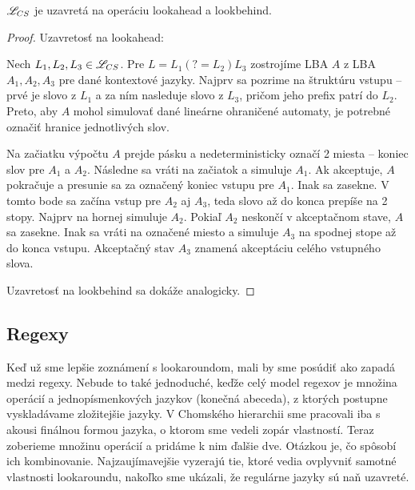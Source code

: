 \begin{veta} \label{CS-lookahead}
$ \mathscr{L}_{CS} $ je uzavretá na operáciu lookahead a lookbehind.
\end{veta} 
\begin{proof}
Uzavretosť na lookahead:

Nech $ L_{1}, L_{2}, L_{3} \in \mathscr{L}_{CS} $. Pre $ L = L_{1}(?=L_{2})L_{3} $ zostrojíme LBA $A$ z LBA $A_1, A_2, A_3$ pre dané kontextové jazyky. Najprv sa pozrime na štruktúru vstupu -- prvé je slovo z $L_1$ a za ním nasleduje slovo z $L_3$, pričom jeho prefix patrí do $L_2$. Preto, aby $A$ mohol simulovať dané lineárne ohraničené automaty, je potrebné označiť hranice jednotlivých slov.

 Na začiatku výpočtu $A$ prejde pásku a nedeterministicky označí 2 miesta -- koniec slov pre $A_1$ a $A_2$. Následne sa vráti na začiatok a simuluje $A_1$. Ak akceptuje, $A$ pokračuje a presunie sa za označený koniec vstupu pre $A_1$. Inak sa zasekne. V tomto bode sa začína vstup pre $A_2$ aj $A_3$, teda slovo až do konca prepíše na 2 stopy. Najprv na hornej simuluje $A_2$. Pokiaľ $A_2$ neskončí v akceptačnom stave, $A$ sa zasekne. Inak sa vráti na označené miesto a simuluje $A_3$ na spodnej stope až do konca vstupu. Akceptačný stav $A_3$ znamená akceptáciu celého vstupného slova.

Uzavretosť na lookbehind sa dokáže analogicky.
\end{proof}

\subsection{Regexy}

Keď už sme lepšie zoznámení s lookaroundom, mali by sme posúdiť ako zapadá medzi regexy. Nebude to také jednoduché, keďže celý model regexov je množina operácií a jednopísmenkových jazykov (konečná abeceda), z ktorých postupne vyskladávame zložitejšie jazyky. V Chomského hierarchii sme pracovali iba s akousi finálnou formou jazyka, o ktorom sme vedeli zopár vlastností. Teraz zoberieme množinu operácií a pridáme k nim ďalšie dve. Otázkou je, čo spôsobí ich kombinovanie. Naj\-zau\-jí\-ma\-vej\-šie vyzerajú tie, ktoré vedia ovplyvniť samotné vlastnosti lookaroundu, nakoľko sme ukázali, že regulárne jazyky sú naň uzavreté.

